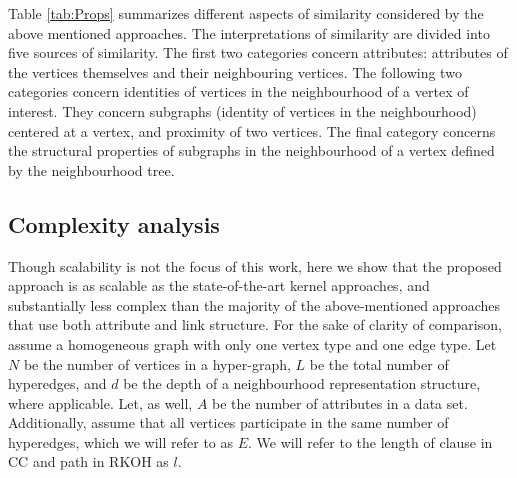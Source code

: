 Table \ref{tab:Props} summarizes different aspects of similarity considered by the above mentioned approaches.
The interpretations of similarity are divided into five sources of similarity.
The first two categories concern attributes: attributes of the vertices themselves and their neighbouring vertices.
The following two categories concern identities of vertices in the neighbourhood of a vertex of interest.
They concern subgraphs (identity of vertices in the neighbourhood) centered at a vertex, and proximity of two vertices.
The final category concerns the structural properties of subgraphs in the neighbourhood of a vertex defined by the neighbourhood tree.


\subsection{Complexity analysis}

Though scalability is not the focus of this work, here we show that the proposed approach is as scalable as the state-of-the-art kernel approaches, and substantially less complex than the majority of the above-mentioned approaches that use both attribute and link structure.
For the sake of clarity of comparison, assume a homogeneous graph with only one vertex type and one edge type.
Let $N$ be the number of vertices in a hyper-graph, $L$ be the total number of hyperedges, and $d$ be the depth of a neighbourhood representation structure, where applicable.
Let, as well, $A$ be the number of attributes in a data set.
Additionally, assume that all vertices participate in the same number of hyperedges, which we will refer to as $E$. 
We will refer to the length of clause in CC and path in RKOH as $l$.
\vspace{2pt}


